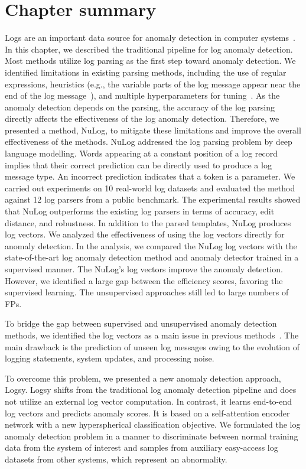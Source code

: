 \section{Chapter summary} \label{conclusion}
Logs are an important data source for anomaly detection in computer systems~\cite{zhu2019tools, du2017deeplog, zhang2019robust}. In this chapter, we described the traditional pipeline for log anomaly detection. Most methods utilize log parsing as the first step toward anomaly detection. We identified limitations in existing parsing methods, including the use of regular expressions, heuristics (e.g., the variable parts of the log message appear near the end of the log message~\cite{he2017drain}), and multiple hyperparameters for tuning~\cite{zhu2019tools,du2016spell,hamooni2016logmine}. As the anomaly detection depends on the parsing, the accuracy of the log parsing directly affects the effectiveness of the log anomaly detection. Therefore, we presented a method, NuLog, to mitigate these limitations and improve the overall effectiveness of the methods. NuLog addressed the log parsing problem by deep language modelling. Words appearing at a constant position of a log record implies that their correct prediction can be directly used to produce a log message type. An incorrect prediction indicates that a token is a parameter. 
We carried out experiments on 10 real-world log datasets and evaluated the method against 12 log parsers from a public benchmark. The experimental results showed that NuLog outperforms the existing log parsers in terms of accuracy, edit distance, and robustness. In addition to the parsed templates, NuLog produces log vectors. We analyzed the effectiveness of using the log vectors directly for anomaly detection. In the analysis, we compared the NuLog log vectors with the state-of-the-art log anomaly detection method and anomaly detector trained in a supervised manner. The NuLog's log vectors improve the anomaly detection. However, we identified a large gap between the efficiency scores, favoring the supervised learning. The unsupervised approaches still led to large numbers of FPs. 

To bridge the gap between supervised and unsupervised anomaly detection methods, we identified the log vectors as a main issue in previous methods~\cite{he2017drain,du2016spell,meng2019loganomaly,zhang2019robust,du2017deeplog}. The main drawback is the prediction of unseen log messages owing to the evolution of logging statements, system updates, and processing noise. 

To overcome this problem, we presented a new anomaly detection approach, Logsy. Logsy shifts from the traditional log anomaly detection pipeline and does not utilize an external log vector computation. In contrast, it learns end-to-end log vectors and predicts anomaly scores. It is based on a self-attention encoder network with a new hyperspherical classification objective. We formulated the log anomaly detection problem in a manner to discriminate between normal training data from the system of interest and samples from auxiliary easy-access log datasets from other systems, which represent an abnormality.

